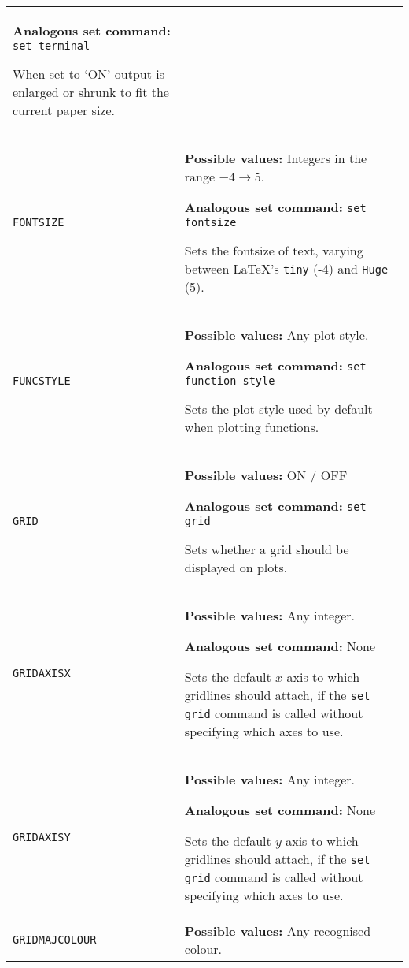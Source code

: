 \documentclass[a4paper,onecolumn,11pt]{book}
\begin{document}
\begin{longtable}{p{3.4cm}p{9cm}}
                   \textbf{Analogous set command:} \texttt{set terminal}\index{set terminal command@\texttt{set terminal} command}
                   
                   When set to `ON' output is enlarged or shrunk to fit the
                   current paper size.
                   \\

\texttt{FONTSIZE} & \textbf{Possible values:} Integers in the range $-4 \to 5$.

                   \textbf{Analogous set command:} \texttt{set fontsize}\index{set fontsize command@\texttt{set fontsize} command}

                   Sets the fontsize of text, varying between \LaTeX's \texttt{tiny} (-4) and \texttt{Huge} (5).
                   \\
\texttt{FUNCSTYLE} & \textbf{Possible values:} Any plot style.

                   \textbf{Analogous set command:} \texttt{set function style}\index{set function style command@\texttt{set function style} command}

                   Sets the plot style used by default when plotting functions.
                   \\
\texttt{GRID} & \textbf{Possible values:} ON / OFF

                   \textbf{Analogous set command:} \texttt{set grid}\index{set grid command@\texttt{set grid} command}

                   Sets whether a grid should be displayed on plots.
                   \\
\texttt{GRIDAXISX} & \textbf{Possible values:} Any integer.

                   \textbf{Analogous set command:} None

                   Sets the default $x$-axis to which gridlines should attach, if the \texttt{set grid} command is called without specifying which axes to use.
                   \\
\texttt{GRIDAXISY} & \textbf{Possible values:} Any integer.

                   \textbf{Analogous set command:} None

                   Sets the default $y$-axis to which gridlines should attach, if the \texttt{set grid} command is called without specifying which axes to use.
                   \\
\texttt{GRIDMAJCOLOUR} & \textbf{Possible values:} Any recognised colour.


\end{longtable}
\end{document}
